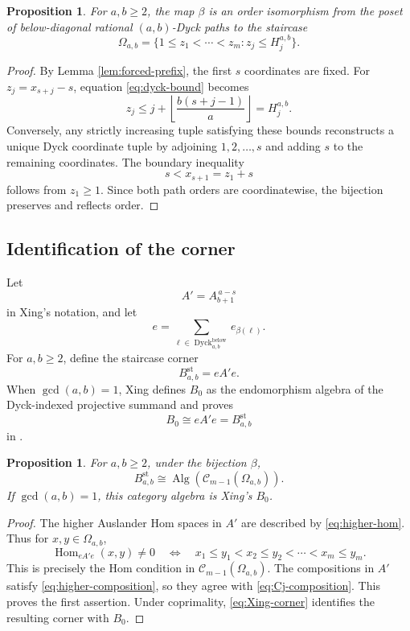 \documentclass[12pt,a4paper,english,reqno]{amsart}
\theoremstyle{plain}
\newtheorem{proposition}[theorem]{Proposition}
\theoremstyle{definition}
\newcommand{\Hom}{\operatorname{Hom}}
\newcommand{\Dyck}{\operatorname{Dyck}}
\newcommand{\C}{\mathcal C}
\begin{document}
\begin{proposition}
\label{prop:dyck-staircase}
For $a,b\geq2$, the map $\beta$ is an order isomorphism from the poset of below-diagonal
rational $(a,b)$-Dyck paths to the staircase
\begin{equation}
 \Omega_{a,b}
 =
 \{1\leq z_1<\cdots<z_m:
 z_j\leq H_j^{a,b}\}.
\label{eq:Omega-ab}
\end{equation}
\end{proposition}

\begin{proof}
By Lemma \ref{lem:forced-prefix}, the first $s$ coordinates are fixed.  For
$z_j=x_{s+j}-s$, equation \eqref{eq:dyck-bound} becomes
\[
 z_j
 \leq j+\left\lfloor\frac{b(s+j-1)}a\right\rfloor
 =H_j^{a,b}.
\]
Conversely, any strictly increasing tuple satisfying these bounds reconstructs
a unique Dyck coordinate tuple by adjoining $1,2,\ldots,s$ and adding $s$
to the remaining coordinates.  The boundary inequality
\[
 s<x_{s+1}=z_1+s
\]
follows from $z_1\geq1$.  Since both path orders are coordinatewise, the
bijection preserves and reflects order.
\end{proof}

\subsection{Identification of the corner}

Let
\[
 A'=A_{b+1}^{\,a-s}
\]
in Xing's notation, and let
\[
 e=\sum_{\ell\in\Dyck^{\mathrm{below}}_{a,b}}e_{\beta(\ell)}.
\]
For $a,b\geq2$, define the staircase corner
\[
 B^{\mathrm{st}}_{a,b}=eA'e.
\]
When $\gcd(a,b)=1$, Xing defines $B_0$ as the endomorphism algebra of
the Dyck-indexed projective summand and proves
\begin{equation}
 B_0\cong eA'e=B^{\mathrm{st}}_{a,b}
\label{eq:Xing-corner}
\end{equation}
in \cite[Proposition~4.33]{Xing}.

\begin{proposition}
\label{prop:B0-C}
For $a,b\geq2$, under the bijection $\beta$,
\[
 B^{\mathrm{st}}_{a,b}
 \cong
 \operatorname{Alg}\!\left(\C_{m-1}(\Omega_{a,b})\right).
\]
If $\gcd(a,b)=1$, this category algebra is Xing's $B_0$.
\end{proposition}

\begin{proof}
The higher Auslander Hom spaces in $A'$ are described by
\eqref{eq:higher-hom}.  Thus for $x,y\in\Omega_{a,b}$,
\[
 \Hom_{eA'e}(x,y)\neq0
\quad\Longleftrightarrow\quad
x_1\leq y_1<x_2\leq y_2<\cdots<x_m\leq y_m.
\]
This is precisely the Hom condition in
$\C_{m-1}(\Omega_{a,b})$.  The compositions in $A'$ satisfy
\eqref{eq:higher-composition}, so they agree with
\eqref{eq:Cj-composition}.  This proves the first assertion.  Under
coprimality, \eqref{eq:Xing-corner} identifies the resulting corner with
$B_0$.
\end{proof}
\end{document}
